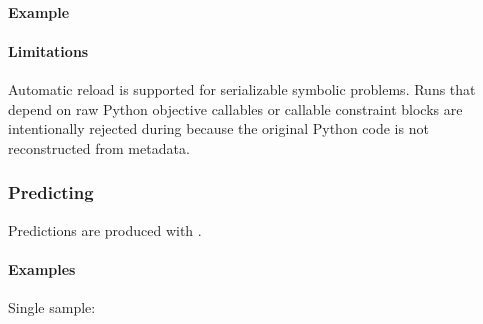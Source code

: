\documentclass[letterpaper,10pt,english,openany,oneside]{sphinxmanual}
\begin{document}
\paragraph{Example}
\label{\detokenize{api/package/execution/loading:example}}
\begin{sphinxVerbatim}[commandchars=\\\{\}]
  
\end{sphinxVerbatim}


\paragraph{Limitations}
\label{\detokenize{api/package/execution/loading:limitations}}
\sphinxAtStartPar
Automatic reload is supported for serializable symbolic problems. Runs that depend on raw Python objective callables or callable constraint blocks are intentionally rejected during  because the original Python code is not reconstructed from metadata.

\sphinxstepscope


\subsubsection{Predicting}
\label{\detokenize{api/package/execution/predicting:predicting}}\label{\detokenize{api/package/execution/predicting::doc}}
\sphinxAtStartPar
Predictions are produced with {\hyperref[\detokenize{api/package/object:nlpoptnet.api.NLPOptNet.predict}]{}}.


\paragraph{Examples}
\label{\detokenize{api/package/execution/predicting:examples}}
\sphinxAtStartPar
Single sample:

\begin{sphinxVerbatim}[commandchars=\\\{\}]
  \PYG{p}{[} \PYG{p}{]}
\end{sphinxVerbatim}
\end{document}
